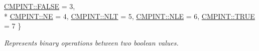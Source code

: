 \begin{DoxyCompactItemize}
\hyperlink{namespacehetest_1_1utils_ac7fa0c35a418955522dc45b10864fdc8a946003f97ccc52d5d3b54ac0ec31bbfc}{C\-M\-P\-I\-N\-T\-::\-F\-A\-L\-S\-E} = 3, 
\\*
\hyperlink{namespacehetest_1_1utils_ac7fa0c35a418955522dc45b10864fdc8adc33066c3993e0d50896e533fd692ce0}{C\-M\-P\-I\-N\-T\-::\-N\-E} = 4, 
\hyperlink{namespacehetest_1_1utils_ac7fa0c35a418955522dc45b10864fdc8ad7d6a13c7b311ec8a3c9fcfb1919a2f8}{C\-M\-P\-I\-N\-T\-::\-N\-L\-T} = 5, 
\hyperlink{namespacehetest_1_1utils_ac7fa0c35a418955522dc45b10864fdc8aacd748f300c5d189c47807e2a9d6ea57}{C\-M\-P\-I\-N\-T\-::\-N\-L\-E} = 6, 
\hyperlink{namespacehetest_1_1utils_ac7fa0c35a418955522dc45b10864fdc8ac0d83f0b82a6b30de8811e69e6d95c61}{C\-M\-P\-I\-N\-T\-::\-T\-R\-U\-E} = 7
 \}
\begin{DoxyCompactList}\small\item\em Represents binary operations between two boolean values. \end{DoxyCompactList}\end{DoxyCompactItemize}
